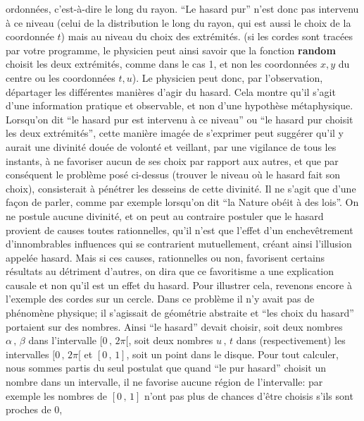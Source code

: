 ordonn\'ees, c'est-\`a-dire le long du rayon. ``Le hasard pur'' n'est  
donc pas intervenu \`a ce niveau (celui de la distribution le long du 
rayon, qui est aussi le choix de la coordonn\'ee $t$) mais  
au niveau du choix des extr\'emit\'es.  (si les cordes sont trac\'ees  
par votre programme, le physicien peut ainsi savoir que la fonction 
{\bf random} choisit les deux extr\'emit\'es, comme dans le cas 1, et 
non les coordonn\'ees $x,y$ du centre ou les coordonn\'ees $t,u$). Le 
physicien peut donc, par l'observation, d\'epartager les diff\'erentes 
mani\`eres d'agir du hasard.  Cela montre qu'il s'agit d'une 
information pratique et observable, et non d'une hypoth\`ese 
m\'etaphysique. 
\medskip 
Lorsqu'on dit  ``le hasard pur est intervenu \`a ce niveau'' ou ``le  
hasard pur choisit les deux extr\'emit\'es'', cette mani\`ere imag\'ee 
de s'exprimer peut sugg\'erer qu'il  y aurait une divinit\'e 
dou\'ee de volont\'e et veillant, par une vigilance de tous les 
instants, \`a ne favoriser aucun de ses choix par rapport aux autres, 
et que par cons\'equent le probl\`eme pos\'e ci-dessus (trouver le 
niveau o\`u le hasard fait son choix), consisterait \`a  
p\'en\'etrer les desseins de cette divinit\'e. Il ne s'agit que d'une  
fa\c con de parler, comme par exemple lorsqu'on dit ``la Nature 
ob\'eit \`a des lois''.   
\medskip 
On ne postule aucune divinit\'e, et on peut au contraire postuler que le 
hasard provient de causes toutes rationnelles, qu'il  n'est que l'effet 
d'un enchev\^etrement d'innombrables influences qui se contrarient 
mutuellement, cr\'eant ainsi l'illusion appel\'ee hasard. Mais si ces 
causes, rationnelles ou non, favorisent certains r\'esultats au  
d\'etriment d'autres, on dira que ce favoritisme a une explication 
causale  et non qu'il est un effet du hasard.    
\medskip 
Pour illustrer cela, revenons encore \`a l'exemple des cordes sur un 
cercle. Dans ce probl\`eme il n'y avait pas de ph\'enom\`ene physique; 
il s'agissait de g\'eom\'etrie abstraite et ``les choix du hasard'' 
portaient sur des nombres. Ainsi ``le hasard'' devait choisir, soit deux 
nombres $\alpha\, , \,\beta$ dans l'intervalle $[ 0\, , \, 2\pi [$, soit 
deux nombres $u\, , \, t$ dans (respectivement) les intervalles $[ 0\, 
, \, 2\pi [$ et $[ 0\, , \, 1]$, soit un point dans le disque. Pour tout 
calculer, nous sommes partis du seul postulat que quand ``le pur 
hasard'' choisit un nombre dans un intervalle, il ne favorise aucune 
r\'egion de l'intervalle: par exemple les nombres de $[ 0\, , \, 1]$ 
n'ont pas plus de chances d'\^etre choisis s'ils sont proches de 0,  
